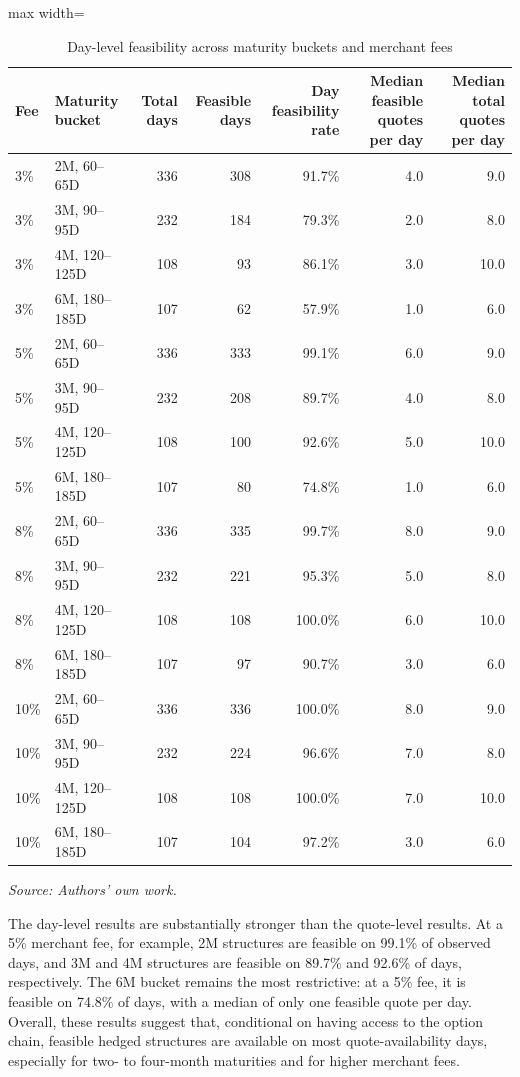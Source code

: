 \documentclass[11pt]{article}
\begin{document}
\begin{table}[htbp]
\centering
\caption{Day-level feasibility across maturity buckets and merchant fees}
\label{tab:day_level_feasibility}
\small
\begin{adjustbox}{max width=\textwidth}
\begin{tabular}{llrrrrr}
\toprule
Fee & Maturity bucket & Total days & Feasible days & Day feasibility rate & Median feasible quotes per day & Median total quotes per day \\
\midrule
3\%  & 2M, 60--65D   & 336 & 308 & 91.7\%  & 4.0 & 9.0  \\
3\%  & 3M, 90--95D   & 232 & 184 & 79.3\%  & 2.0 & 8.0  \\
3\%  & 4M, 120--125D & 108 & 93  & 86.1\%  & 3.0 & 10.0 \\
3\%  & 6M, 180--185D & 107 & 62  & 57.9\%  & 1.0 & 6.0  \\
5\%  & 2M, 60--65D   & 336 & 333 & 99.1\%  & 6.0 & 9.0  \\
5\%  & 3M, 90--95D   & 232 & 208 & 89.7\%  & 4.0 & 8.0  \\
5\%  & 4M, 120--125D & 108 & 100 & 92.6\%  & 5.0 & 10.0 \\
5\%  & 6M, 180--185D & 107 & 80  & 74.8\%  & 1.0 & 6.0  \\
8\%  & 2M, 60--65D   & 336 & 335 & 99.7\%  & 8.0 & 9.0  \\
8\%  & 3M, 90--95D   & 232 & 221 & 95.3\%  & 5.0 & 8.0  \\
8\%  & 4M, 120--125D & 108 & 108 & 100.0\% & 6.0 & 10.0 \\
8\%  & 6M, 180--185D & 107 & 97  & 90.7\%  & 3.0 & 6.0  \\
10\% & 2M, 60--65D   & 336 & 336 & 100.0\% & 8.0 & 9.0  \\
10\% & 3M, 90--95D   & 232 & 224 & 96.6\%  & 7.0 & 8.0  \\
10\% & 4M, 120--125D & 108 & 108 & 100.0\% & 7.0 & 10.0 \\
10\% & 6M, 180--185D & 107 & 104 & 97.2\%  & 3.0 & 6.0  \\
\bottomrule
\end{tabular}
\end{adjustbox}
\vspace{-0.5em}
\begin{flushleft}
\footnotesize \textit{Source: Authors' own work.}
\end{flushleft}
\end{table}

The day-level results are substantially stronger than the quote-level results. At a 5\% merchant fee, for example, 2M structures are feasible on 99.1\% of observed days, and 3M and 4M structures are feasible on 89.7\% and 92.6\% of days, respectively. The 6M bucket remains the most restrictive: at a 5\% fee, it is feasible on 74.8\% of days, with a median of only one feasible quote per day. Overall, these results suggest that, conditional on having access to the option chain, feasible hedged structures are available on most quote-availability days, especially for two- to four-month maturities and for higher merchant fees.
\end{document}
